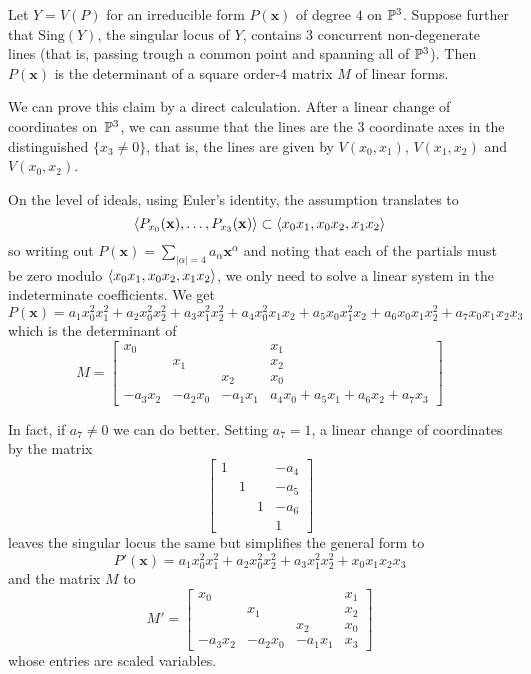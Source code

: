 \documentclass[fleqn,reqno]{amsart}
\begin{document}
\begin{example}[$\mt{ex312}$]
\label{ex312}
Let $Y=V(P)$ for an irreducible form $P(\mathbf x)$ of degree $4$ on $\mathbb{P}^3$.
Suppose further that $\text{Sing}(Y)$, the singular locus of $Y$,
contains 3 concurrent non-degenerate lines
(that is, passing trough a common point and spanning all of $\mathbb{P}^3$).
Then $P(\mathbf x)$ is the determinant of a square order-$4$ matrix $M$ of linear forms.

We can prove this claim by a direct calculation.
After a linear change of coordinates on~$\mathbb{P}^3$,
we can assume that the lines are the 3 coordinate axes in the distinguished $\{x_3\neq0\}$,
that is, the lines are given by $V(x_0,x_1)$, $V(x_1,x_2)$ and $V(x_0,x_2)$.

On the level of ideals, using Euler's identity, the assumption translates to
\[
	\langle P_{x_0}(\mathbf x),\ldots, P_{x_3}(\mathbf x) \rangle\subset\langle x_0x_1,x_0x_2,x_1x_2\rangle
\]
so writing out $P(\mathbf x)=\sum_{|\alpha|=4} a_\alpha {\mathbf x}^\alpha$
and noting that each of the partials must be zero modulo $\langle x_0x_1,x_0x_2,x_1x_2\rangle$,
we only need to solve a linear system in the indeterminate coefficients.
We get
\[
	P(\mathbf x)=
	a_1x_0^2x_1^2+a_2x_0^2x_2^2+a_3x_1^2x_2^2+a_4x_0^2x_1x_2+a_5x_0x_1^2x_2+a_6x_0x_1x_2^2+a_7x_0x_1x_2x_3
\]
which is the determinant of
\[
	M=\begin{bmatrix}
	x_0&&&x_1\\
	&x_1&&x_2\\
	&&x_2&x_0\\
	-a_3x_2&-a_2x_0&-a_1x_1& a_4x_0+a_5x_1+a_6x_2+a_7x_3
	\end{bmatrix}
\]

In fact, if $a_7\neq0$ we can do better.
Setting $a_7=1$, a linear change of coordinates by the matrix
\[
\begin{bmatrix}
1&&&-a_4\\
&1&&-a_5\\
&&1&-a_6\\
&&&1
\end{bmatrix}
\]
leaves the singular locus the same but simplifies the general form to
\[
P'(\mathbf x)=a_1x_0^2x_1^2+a_2x_0^2x_2^2+a_3x_1^2x_2^2+x_0x_1x_2x_3
\]
and the matrix $M$ to
\[
M'=\begin{bmatrix}
x_0&&&x_1\\
&x_1&&x_2\\
&&x_2&x_0\\
-a_3x_2&-a_2x_0&-a_1x_1&x_3
\end{bmatrix}
\]
whose entries are scaled variables.
\end{example}
\end{document}
